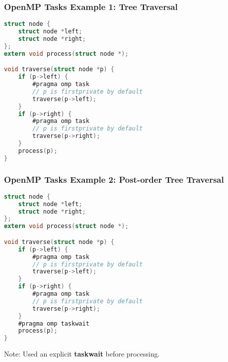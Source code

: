 \begin{frame}[fragile]
  \frametitle{OpenMP Tasks Example 1: Tree Traversal}

\begin{changemargin}{2cm}
  
  \begin{lstlisting}[language=C,morekeywords={foreach,pragma,omp,parallel,single,nowait,task,untied,barrier,taskyield,mergeable,final,taskwait,critical}]
struct node {
    struct node *left;
    struct node *right;
};
extern void process(struct node *);

void traverse(struct node *p) {
    if (p->left) {
        #pragma omp task
        // p is firstprivate by default
        traverse(p->left);
    }
    if (p->right) {
        #pragma omp task
        // p is firstprivate by default
        traverse(p->right);
    }
    process(p);
}    
  \end{lstlisting}
\end{changemargin}
\end{frame}

\begin{frame}[fragile]
  \frametitle{OpenMP Tasks Example 2: Post-order Tree Traversal}

\begin{changemargin}{2cm}
  \begin{lstlisting}[language=C,morekeywords={foreach,pragma,omp,parallel,single,nowait,task,untied,barrier,taskyield,mergeable,final,taskwait,critical}]
struct node {
    struct node *left;
    struct node *right;
};
extern void process(struct node *);

void traverse(struct node *p) {
    if (p->left) {
        #pragma omp task
        // p is firstprivate by default
        traverse(p->left);
    }
    if (p->right) {
        #pragma omp task
        // p is firstprivate by default
        traverse(p->right);
    }
    #pragma omp taskwait
    process(p);
}    
  \end{lstlisting}
  
\large
  Note: Used an explicit {\bf taskwait} before processing.
\end{changemargin}
  
\end{frame}


